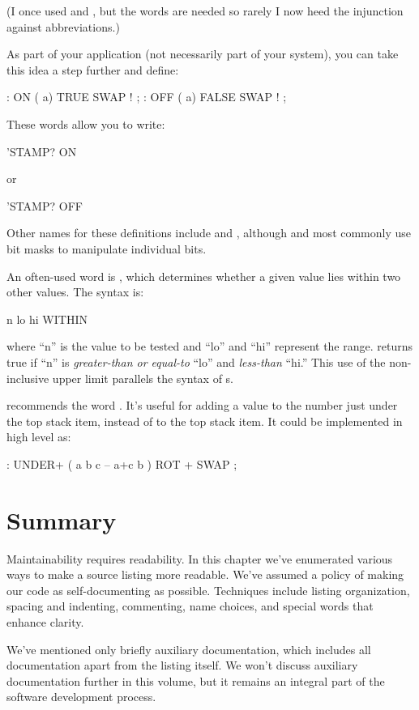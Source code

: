 (I once used  and , but the words are
needed so rarely I now heed the injunction against abbreviations.)

As part of your application (not necessarily part of your \Forth{}
system), you can take this idea a step further and define:
\begin{Code}
: ON   ( a)  TRUE SWAP ! ;
: OFF   ( a)  FALSE SWAP ! ;
\end{Code}
%
These words allow you to write:
\begin{Code}
'STAMP? ON
\end{Code}
or
\begin{Code}
'STAMP? OFF
\end{Code}
Other names for these definitions include  and
, although  and  most commonly
use bit masks to manipulate individual bits.

An often-used word is , which determines
whether a given value lies within two other values.  The syntax is:
\begin{Code}
n  lo hi WITHIN
\end{Code}
where ``n'' is the value to be tested and ``lo'' and ``hi'' represent
the range.  returns true if ``n'' is
\emph{greater-than or equal-to} ``lo'' and \emph{less-than}
``hi.'' This use of the non-inclusive upper limit parallels the syntax
of s.

 recommends the word .
It's useful for adding a value to the number just under the top stack
item, instead of to the top stack item.  It could be implemented in
high level as:
\begin{Code}
: UNDER+  ( a b c -- a+c b )  ROT +  SWAP ;
\end{Code}

\section{Summary}
Maintainability requires readability.  In this chapter we've enumerated
various ways to make a source listing more readable.  We've assumed a
policy of making our code as self-documenting as possible.  Techniques
include listing organization, spacing and indenting, commenting, name
choices, and special words that enhance clarity.

We've mentioned only briefly auxiliary documentation, which includes
all documentation apart from the listing itself.  We won't discuss
auxiliary documentation further in this volume, but it remains an
integral part of the software development process.%

